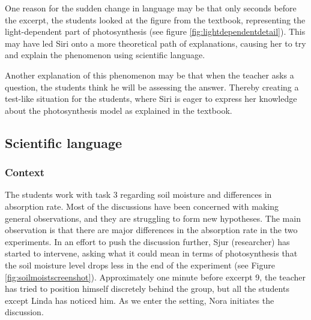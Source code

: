 One reason for the sudden change in language may be that only seconds before the excerpt, the students looked at the figure from the textbook, representing the light-dependent part of photosynthesis (see figure \ref{fig:lightdependentdetail}). This may have led Siri onto a more theoretical path of explanations, causing her to try and explain the phenomenon using scientific language. 

Another explanation of this phenomenon may be that when the teacher asks a question, the students think he will be assessing the answer. Thereby creating a test-like situation for the students, where Siri is eager to express her knowledge about the photosynthesis model as explained in the textbook. 

\subsection{Scientific language}
\subsubsection*{Context}
The students work with task 3 regarding soil moisture and differences in absorption rate. Most of the discussions have been concerned with making general observations, and they are struggling to form new hypotheses. The main observation is that there are major differences in the absorption rate in the two experiments. In an effort to push the discussion further, Sjur (researcher) has started to intervene, asking what it could mean in terms of photosynthesis that the soil moisture level drops less in the end of the experiment (see Figure \ref{fig:soilmoistscreenshot}). Approximately one minute before excerpt 9, the teacher has tried to position himself discretely behind the group, but all the students except Linda has noticed him. As we enter the setting, Nora initiates the discussion.

